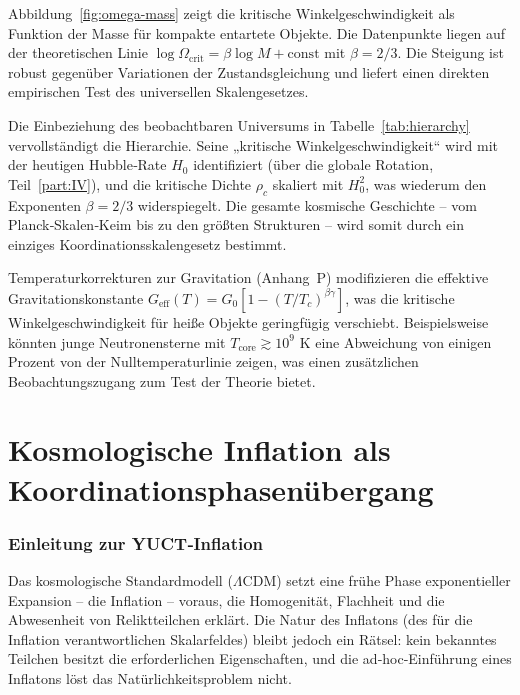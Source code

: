 \documentclass[11pt,a4paper]{article}
\begin{document}
	Abbildung~\ref{fig:omega-mass} zeigt die kritische Winkelgeschwindigkeit als Funktion der Masse für kompakte entartete Objekte. Die Datenpunkte liegen auf der theoretischen Linie \(\log\Omega_{\mathrm{crit}} = \beta \log M + \mathrm{const}\) mit \(\beta = 2/3\). Die Steigung ist robust gegenüber Variationen der Zustandsgleichung und liefert einen direkten empirischen Test des universellen Skalengesetzes.
	
	Die Einbeziehung des beobachtbaren Universums in Tabelle~\ref{tab:hierarchy} vervollständigt die Hierarchie. Seine „kritische Winkelgeschwindigkeit“ wird mit der heutigen Hubble‑Rate \(H_0\) identifiziert (über die globale Rotation, Teil~\ref{part:IV}), und die kritische Dichte \(\rho_c\) skaliert mit \(H_0^2\), was wiederum den Exponenten \(\beta=2/3\) widerspiegelt. Die gesamte kosmische Geschichte – vom Planck‑Skalen‑Keim bis zu den größten Strukturen – wird somit durch ein einziges Koordinationsskalengesetz bestimmt.
	
	Temperaturkorrekturen zur Gravitation (Anhang~P) modifizieren die effektive Gravitationskonstante \(G_{\mathrm{eff}}(T) = G_0[1 - (T/T_c)^{\beta\gamma}]\), was die kritische Winkelgeschwindigkeit für heiße Objekte geringfügig verschiebt. Beispielsweise könnten junge Neutronensterne mit \(T_{\mathrm{core}} \gtrsim 10^9\) K eine Abweichung von einigen Prozent von der Nulltemperaturlinie zeigen, was einen zusätzlichen Beobachtungszugang zum Test der Theorie bietet.
	
	\part{Kosmologische Inflation als Koordinationsphasenübergang}
	\label{part:III}
	
	\section{Einleitung zur YUCT‑Inflation}
	\label{sec:intro-inflation}
	
	Das kosmologische Standardmodell (\(\Lambda\)CDM) setzt eine frühe Phase exponentieller Expansion – die Inflation – voraus, die Homogenität, Flachheit und die Abwesenheit von Reliktteilchen erklärt. Die Natur des Inflatons (des für die Inflation verantwortlichen Skalarfeldes) bleibt jedoch ein Rätsel: kein bekanntes Teilchen besitzt die erforderlichen Eigenschaften, und die ad‑hoc‑Einführung eines Inflatons löst das Natürlichkeitsproblem nicht.
	
\end{document}
